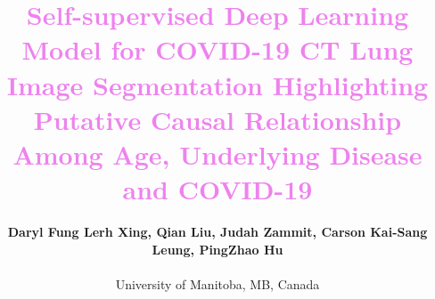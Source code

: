 \documentclass[journal]{IEEEtran}
\title{\textcolor{violet}{Self-supervised Deep Learning Model for COVID-19 CT Lung Image Segmentation Highlighting Putative Causal Relationship Among Age, Underlying Disease and COVID-19}}
\begin{document}

%
%

\author{\textbf{Daryl Fung Lerh Xing, Qian Liu, Judah Zammit, Carson Kai-Sang Leung, PingZhao Hu}\\
\vspace*{0.1cm}

\small
University of Manitoba, MB, Canada\\

\normalsize
	
}

% 
%
%
\end{document}
